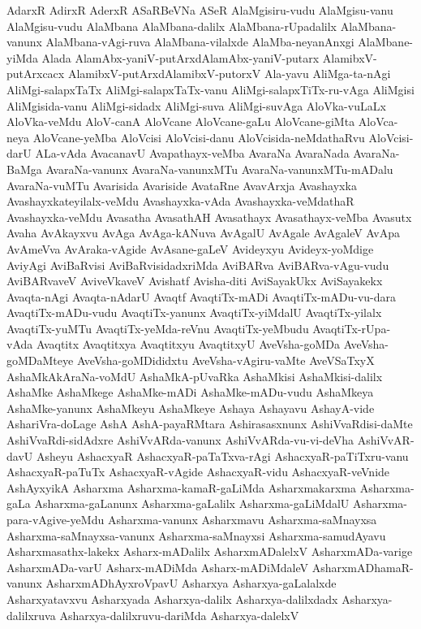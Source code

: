 {AdarxR
AdirxR
AderxR
ASaRBeVNa
ASeR
AlaMgisiru-vudu
AlaMgisu-vanu
AlaMgisu-vudu
AlaMbana
AlaMbana-dalilx
AlaMbana-rUpadalilx
AlaMbana-vanunx
AlaMbana-vAgi-ruva
AlaMbana-vilalxde
AlaMba-neyanAnxgi
AlaMbane-yiMda
Alada
AlamAbx-yaniV-putArxdAlamAbx-yaniV-putarx
AlamibxV-putArxcacx
AlamibxV-putArxdAlamibxV-putorxV
Ala-yavu
AliMga-ta-nAgi
AliMgi-salapxTaTx
AliMgi-salapxTaTx-vanu
AliMgi-salapxTiTx-ru-vAga
AliMgisi
AliMgisida-vanu
AliMgi-sidadx
AliMgi-suva
AliMgi-suvAga
AloVka-vuLaLx
AloVka-veMdu
AloV-canA
AloVcane
AloVcane-gaLu
AloVcane-giMta
AloVca-neya
AloVcane-yeMba
AloVcisi
AloVcisi-danu
AloVcisida-neMdathaRvu
AloVcisi-darU
ALa-vAda
AvacanavU
Avapathayx-veMba
AvaraNa
AvaraNada
AvaraNa-BaMga
AvaraNa-vanunx
AvaraNa-vanunxMTu
AvaraNa-vanunxMTu-mADalu
AvaraNa-vuMTu
Avarisida
Avariside
AvataRne
AvavArxja
Avashayxka
Avashayxkateyilalx-veMdu
Avashayxka-vAda
Avashayxka-veMdathaR
Avashayxka-veMdu
Avasatha
AvasathAH
Avasathayx
Avasathayx-veMba
Avasutx
Avaha
AvAkayxvu
AvAga
AvAga-kANuva
AvAgalU
AvAgale
AvAgaleV
AvApa
AvAmeVva
AvAraka-vAgide
AvAsane-gaLeV
Avideyxyu
Avideyx-yoMdige
AviyAgi
AviBaRvisi
AviBaRvisidadxriMda
AviBARva
AviBARva-vAgu-vudu
AviBARvaveV
AviveVkaveV
Avishatf
Avisha-diti
AviSayakUkx
AviSayakekx
Avaqta-nAgi
Avaqta-nAdarU
Avaqtf
AvaqtiTx-mADi
AvaqtiTx-mADu-vu-dara
AvaqtiTx-mADu-vudu
AvaqtiTx-yanunx
AvaqtiTx-yiMdalU
AvaqtiTx-yilalx
AvaqtiTx-yuMTu
AvaqtiTx-yeMda-reVnu
AvaqtiTx-yeMbudu
AvaqtiTx-rUpa-vAda
Avaqtitx
Avaqtitxya
Avaqtitxyu
AvaqtitxyU
AveVsha-goMDa
AveVsha-goMDaMteye
AveVsha-goMDididxtu
AveVsha-vAgiru-vaMte
AveVSaTxyX
AshaMkAkAraNa-voMdU
AshaMkA-pUvaRka
AshaMkisi
AshaMkisi-dalilx
AshaMke
AshaMkege
AshaMke-mADi
AshaMke-mADu-vudu
AshaMkeya
AshaMke-yanunx
AshaMkeyu
AshaMkeye
Ashaya
Ashayavu
AshayA-vide
AshariVra-doLage
AshA
AshA-payaRMtara
Ashirasasxnunx
AshiVvaRdisi-daMte
AshiVvaRdi-sidAdxre
AshiVvARda-vanunx
AshiVvARda-vu-vi-deVha
AshiVvAR-davU
Asheyu
AshacxyaR
AshacxyaR-paTaTxva-rAgi
AshacxyaR-paTiTxru-vanu
AshacxyaR-paTuTx
AshacxyaR-vAgide
AshacxyaR-vidu
AshacxyaR-veVnide
AshAyxyikA
Asharxma
Asharxma-kamaR-gaLiMda
Asharxmakarxma
Asharxma-gaLa
Asharxma-gaLanunx
Asharxma-gaLalilx
Asharxma-gaLiMdalU
Asharxma-para-vAgive-yeMdu
Asharxma-vanunx
Asharxmavu
Asharxma-saMnayxsa
Asharxma-saMnayxsa-vanunx
Asharxma-saMnayxsi
Asharxma-samudAyavu
Asharxmasathx-lakekx
Asharx-mADalilx
AsharxmADalelxV
AsharxmADa-varige
AsharxmADa-varU
Asharx-mADiMda
Asharx-mADiMdaleV
AsharxmADhamaR-vanunx
AsharxmADhAyxroVpavU
Asharxya
Asharxya-gaLalalxde
Asharxyatavxvu
Asharxyada
Asharxya-dalilx
Asharxya-dalilxdadx
Asharxya-dalilxruva
Asharxya-dalilxruvu-dariMda
Asharxya-dalelxV
}
